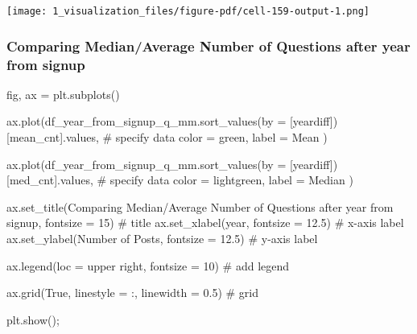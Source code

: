 \documentclass[
  letterpaper,
  DIV=11,
  numbers=noendperiod]{scrartcl}
\newenvironment{Shaded}{\begin{snugshade}}{\end{snugshade}}
\newcommand{\CommentTok}[1]{\textcolor[rgb]{0.37,0.37,0.37}{#1}}
\newcommand{\DecValTok}[1]{\textcolor[rgb]{0.68,0.00,0.00}{#1}}
\newcommand{\FloatTok}[1]{\textcolor[rgb]{0.68,0.00,0.00}{#1}}
\newcommand{\NormalTok}[1]{\textcolor[rgb]{0.00,0.23,0.31}{#1}}
\newcommand{\OperatorTok}[1]{\textcolor[rgb]{0.37,0.37,0.37}{#1}}
\newcommand{\StringTok}[1]{\textcolor[rgb]{0.13,0.47,0.30}{#1}}
\newcommand{\VariableTok}[1]{\textcolor[rgb]{0.07,0.07,0.07}{#1}}
\begin{document}
\texttt{[image: 1\_visualization\_files/figure-pdf/cell-159-output-1.png]}

\subsubsection{Comparing Median/Average Number of Questions after year
from
signup}\label{comparing-medianaverage-number-of-questions-after-year-from-signup}

\begin{Shaded}
\begin{Highlighting}[]
\NormalTok{fig, ax }\OperatorTok{=}\NormalTok{ plt.subplots()}


\NormalTok{ax.plot(df\_year\_from\_signup\_q\_mm.sort\_values(by }\OperatorTok{=}\NormalTok{ [}\StringTok{\textquotesingle{}yeardiff\textquotesingle{}}\NormalTok{])[}\StringTok{\textquotesingle{}mean\_cnt\textquotesingle{}}\NormalTok{].values, }\CommentTok{\# specify data}
\NormalTok{        color }\OperatorTok{=} \StringTok{\textquotesingle{}green\textquotesingle{}}\NormalTok{,}
\NormalTok{        label }\OperatorTok{=} \StringTok{\textquotesingle{}Mean\textquotesingle{}}
\NormalTok{) }

\NormalTok{ax.plot(df\_year\_from\_signup\_q\_mm.sort\_values(by }\OperatorTok{=}\NormalTok{ [}\StringTok{\textquotesingle{}yeardiff\textquotesingle{}}\NormalTok{])[}\StringTok{\textquotesingle{}med\_cnt\textquotesingle{}}\NormalTok{].values, }\CommentTok{\# specify data}
\NormalTok{        color }\OperatorTok{=} \StringTok{\textquotesingle{}lightgreen\textquotesingle{}}\NormalTok{,}
\NormalTok{        label }\OperatorTok{=} \StringTok{\textquotesingle{}Median\textquotesingle{}}
\NormalTok{) }



\NormalTok{ax.set\_title(}\StringTok{\textquotesingle{}Comparing Median/Average Number of Questions after year from signup\textquotesingle{}}\NormalTok{, fontsize }\OperatorTok{=} \DecValTok{15}\NormalTok{) }\CommentTok{\# title}
\NormalTok{ax.set\_xlabel(}\StringTok{\textquotesingle{}year\textquotesingle{}}\NormalTok{, fontsize }\OperatorTok{=} \FloatTok{12.5}\NormalTok{) }\CommentTok{\# x{-}axis label}
\NormalTok{ax.set\_ylabel(}\StringTok{\textquotesingle{}Number of Posts\textquotesingle{}}\NormalTok{, fontsize }\OperatorTok{=} \FloatTok{12.5}\NormalTok{) }\CommentTok{\# y{-}axis label}

\NormalTok{ax.legend(loc }\OperatorTok{=} \StringTok{\textquotesingle{}upper right\textquotesingle{}}\NormalTok{, fontsize }\OperatorTok{=} \DecValTok{10}\NormalTok{) }\CommentTok{\# add legend}

\NormalTok{ax.grid(}\VariableTok{True}\NormalTok{, linestyle }\OperatorTok{=} \StringTok{\textquotesingle{}:\textquotesingle{}}\NormalTok{, linewidth }\OperatorTok{=} \FloatTok{0.5}\NormalTok{) }\CommentTok{\# grid}

\NormalTok{plt.show()}\OperatorTok{;}
\end{Highlighting}
\end{Shaded}
\end{document}
